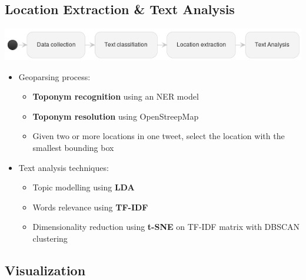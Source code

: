 \documentclass{beamer}
\begin{document}
\subsection{Location Extraction \& Text Analysis}
\begin{frame}[t]

  \includegraphics[scale=0.4]{./images/p3.png}

  \begin{itemize}
    \item Geoparsing process:
      \begin{itemize}
        \item \textbf{Toponym recognition} using an NER model
        \item \textbf{Toponym resolution} using OpenStreepMap
        \item Given two or more locations in one tweet, select the location with the smallest bounding box
      \end{itemize}

\item Text analysis techniques:
      \begin{itemize}
        \item Topic modelling using \textbf{LDA}
        \item Words relevance using \textbf{TF-IDF}
        \item Dimensionality reduction using \textbf{t-SNE} on TF-IDF matrix with DBSCAN clustering
      \end{itemize}
  \end{itemize}
\end{frame}

\subsection{Visualization}
\end{document}
